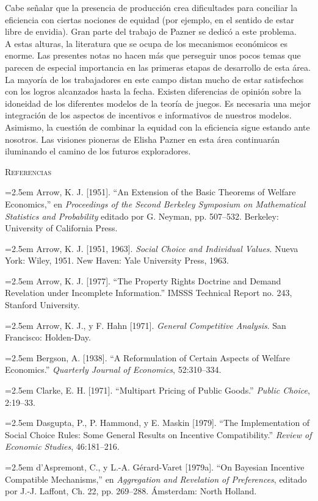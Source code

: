 \documentclass[12pt, letterpaper]{article}
\newcommand{\bibentry}[1]{\noindent\hangindent=2.5em\hangafter=1 \small #1 \par\vspace{0.75em}}
\begin{document}
Cabe señalar que la presencia de producción crea dificultades para conciliar la eficiencia con ciertas nociones de equidad (por ejemplo, en el sentido de estar libre de envidia). Gran parte del trabajo de Pazner se dedicó a este problema. \\

A estas alturas, la literatura que se ocupa de los mecanismos económicos es enorme. Las presentes notas no hacen más que perseguir unos pocos temas que parecen de especial importancia en las primeras etapas de desarrollo de esta área. La mayoría de los trabajadores en este campo distan mucho de estar satisfechos con los logros alcanzados hasta la fecha. Existen diferencias de opinión sobre la idoneidad de los diferentes modelos de la teoría de juegos. Es necesaria una mejor integración de los aspectos de incentivos e informativos de nuestros modelos. Asimismo, la cuestión de combinar la equidad con la eficiencia sigue estando ante nosotros. Las visiones pioneras de Elisha Pazner en esta área continuarán iluminando el camino de los futuros exploradores.
\vspace{1.5cm}
\begin{center}
    {\large\scshape\color{MidnightBlue} Referencias}
    \vspace{0.8cm}
\end{center}
\bibentry{Arrow, K. J. [1951]. ``An Extension of the Basic Theorems of Welfare Economics,'' en \textit{Proceedings of the Second Berkeley Symposium on Mathematical Statistics and Probability} editado por G. Neyman, pp. 507--532. Berkeley: University of California Press.}
\bibentry{Arrow, K. J. [1951, 1963]. \textit{Social Choice and Individual Values}. Nueva York: Wiley, 1951. New Haven: Yale University Press, 1963.}
\bibentry{Arrow, K. J. [1977]. ``The Property Rights Doctrine and Demand Revelation under Incomplete Information.'' IMSSS Technical Report no. 243, Stanford University.}
\bibentry{Arrow, K. J., y F. Hahn [1971]. \textit{General Competitive Analysis}. San Francisco: Holden-Day.}
\bibentry{Bergson, A. [1938]. ``A Reformulation of Certain Aspects of Welfare Economics.'' \textit{Quarterly Journal of Economics}, 52:310--334.}
\bibentry{Clarke, E. H. [1971]. ``Multipart Pricing of Public Goods.'' \textit{Public Choice}, 2:19--33.}
\bibentry{Dasgupta, P., P. Hammond, y E. Maskin [1979]. ``The Implementation of Social Choice Rules: Some General Results on Incentive Compatibility.'' \textit{Review of Economic Studies}, 46:181--216.}
\bibentry{d'Aspremont, C., y L.-A. Gérard-Varet [1979a]. ``On Bayesian Incentive Compatible Mechanisms,'' en \textit{Aggregation and Revelation of Preferences}, editado por J.-J. Laffont, Ch. 22, pp. 269--288. Ámsterdam: North Holland.}
\end{document}

